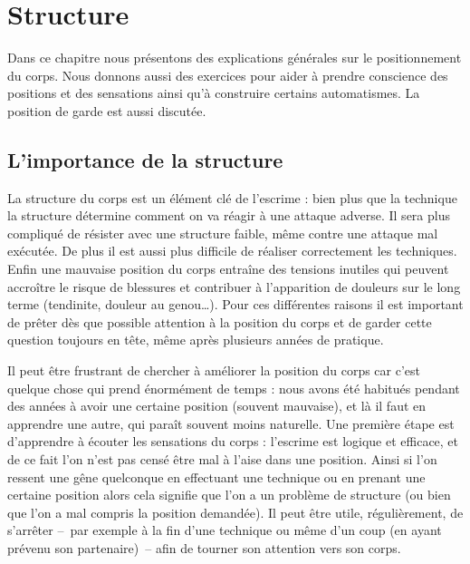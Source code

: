 \chapter{Structure}


Dans ce chapitre nous présentons des explications générales sur le positionnement du corps.
Nous donnons aussi des exercices pour aider à prendre conscience des positions et des sensations ainsi qu'à construire certains automatismes.
La position de garde est aussi discutée.


\section{L'importance de la structure}
\label{sec:structure:général}


La structure du corps est un élément clé de l'escrime : bien plus que la technique la structure détermine comment on va réagir à une attaque adverse.
Il sera plus compliqué de résister avec une structure faible, même contre une attaque mal exécutée.
De plus il est aussi plus difficile de réaliser correctement les techniques.
Enfin une mauvaise position du corps entraîne des tensions inutiles qui peuvent accroître le risque de blessures et contribuer à l'apparition de douleurs sur le long terme (tendinite, douleur au genou…).
Pour ces différentes raisons il est important de prêter dès que possible attention à la position du corps et de garder cette question toujours en tête, même après plusieurs années de pratique.

Il peut être frustrant de chercher à améliorer la position du corps car c'est quelque chose qui prend énormément de temps : nous avons été habitués pendant des années à avoir une certaine position (souvent mauvaise), et là il faut en apprendre une autre, qui paraît souvent moins naturelle.
Une première étape est d'apprendre à écouter les sensations du corps : l'escrime est logique et efficace, et de ce fait l'on n'est pas censé être mal à l'aise dans une position.
Ainsi si l'on ressent une gêne quelconque en effectuant une technique ou en prenant une certaine position alors cela signifie que l'on a un problème de structure (ou bien que l'on a mal compris la position demandée).
Il peut être utile, régulièrement, de s'arrêter -- par exemple à la fin d'une technique ou même d'un coup (en ayant prévenu son partenaire) -- afin de tourner son attention vers son corps.


